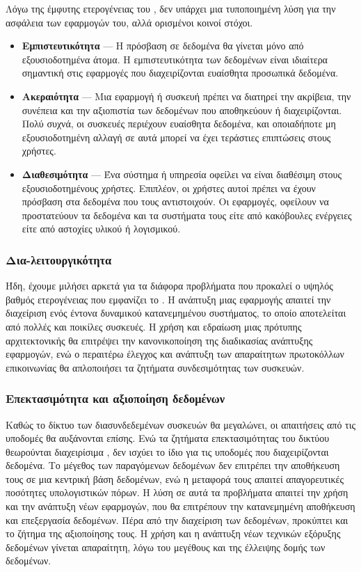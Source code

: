Λόγω της έμφυτης ετερογένειας του , δεν υπάρχει μια τυποποιημένη λύση για την ασφάλεια των εφαρμογών του, αλλά ορισμένοι κοινοί στόχοι.
\begin{itemize}
    \item \textbf{Εμπιστευτικότητα} --- Η πρόσβαση σε δεδομένα θα γίνεται μόνο από εξουσιοδοτημένα άτομα. Η εμπιστευτικότητα των δεδομένων είναι ιδιαίτερα σημαντική στις εφαρμογές που διαχειρίζονται ευαίσθητα προσωπικά δεδομένα.
    \item \textbf{Ακεραιότητα} --- Μια  εφαρμογή ή συσκευή πρέπει να διατηρεί την ακρίβεια, την συνέπεια και την αξιοπιστία των δεδομένων που αποθηκεύουν ή διαχειρίζονται. Πολύ συχνά, οι  συσκευές περιέχουν ευαίσθητα δεδομένα, και οποιαδήποτε μη εξουσιοδοτημένη αλλαγή σε αυτά μπορεί να έχει τεράστιες επιπτώσεις στους χρήστες.
    \item \textbf{Διαθεσιμότητα} --- Ένα  σύστημα ή υπηρεσία οφείλει να είναι διαθέσιμη στους εξουσιοδοτημένους χρήστες. Επιπλέον, οι χρήστες αυτοί πρέπει να έχουν πρόσβαση στα δεδομένα που τους αντιστοιχούν. Οι  εφαρμογές, οφείλουν να προστατεύουν τα δεδομένα και τα συστήματα τους είτε από κακόβουλες ενέργειες είτε από αστοχίες υλικού ή λογισμικού.
\end{itemize}
\subsubsection{Δια-λειτουργικότητα}
Ήδη, έχουμε μιλήσει αρκετά για τα διάφορα προβλήματα που προκαλεί ο υψηλός βαθμός ετερογένειας που εμφανίζει το .
Η ανάπτυξη μιας εφαρμογής  απαιτεί την διαχείριση ενός έντονα δυναμικού κατανεμημένου συστήματος, το οποίο αποτελείται από πολλές και ποικίλες συσκευές.
Η χρήση και εδραίωση μιας πρότυπης  αρχιτεκτονικής θα επιτρέψει την κανονικοποίηση της διαδικασίας ανάπτυξης εφαρμογών, ενώ ο περαιτέρω έλεγχος και ανάπτυξη των απαραίτητων πρωτοκόλλων επικοινωνίας θα απλοποιήσει τα ζητήματα συνδεσιμότητας των συσκευών.
\subsubsection{Επεκτασιμότητα και αξιοποίηση δεδομένων}
Καθώς το δίκτυο των διασυνδεδεμένων συσκευών θα μεγαλώνει, οι απαιτήσεις από τις υποδομές θα αυξάνονται επίσης.
Ενώ τα ζητήματα επεκτασιμότητας του δικτύου θεωρούνται διαχειρίσιμα \cite{borgia2014}, δεν ισχύει το ίδιο για τις υποδομές που διαχειρίζονται δεδομένα.
Το μέγεθος των παραγόμενων δεδομένων δεν επιτρέπει την αποθήκευση τους σε μια κεντρική βάση δεδομένων, ενώ η μεταφορά τους απαιτεί απαγορευτικές ποσότητες υπολογιστικών πόρων.
Η λύση σε αυτά τα προβλήματα απαιτεί την χρήση και την ανάπτυξη νέων  εφαρμογών, που θα επιτρέπουν την κατανεμημένη αποθήκευση και επεξεργασία δεδομένων.
Πέρα από την διαχείριση των δεδομένων, προκύπτει και το ζήτημα της αξιοποίησης τους.
Η χρήση και η ανάπτυξη νέων τεχνικών εξόρυξης δεδομένων γίνεται απαραίτητη, λόγω του μεγέθους και της έλλειψης δομής των δεδομένων.
